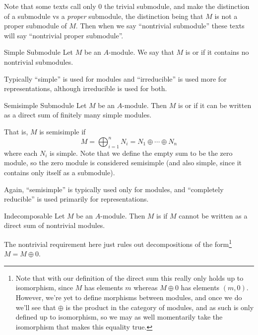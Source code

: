 \documentclass[fleqn]{NotesClass}
\begin{document}
    Note that some texts call only \(0\) the trivial submodule, and make the distinction of a submodule vs a \emph{proper} submodule, the distinction being that \(M\) is not a proper submodule of \(M\).
    Then when we say \enquote{nontrivial submodule} these texts will say \enquote{nontrivial proper submodule}.
    
    \begin{dfn}{Simple Submodule}{}
        Let \(M\) be an \(A\)-module.
        We say that \(M\) is  or  if it contains no nontrivial submodules.
    \end{dfn}
    
    Typically \enquote{simple} is used for modules and \enquote{irreducible} is used more for representations, although irreducible is used for both.
    
    \begin{dfn}{Semisimple Submodule}{}
        Let \(M\) be an \(A\)-module.
        Then \(M\) is  or  if it can be written as a direct sum of finitely many simple modules.
    \end{dfn}
    
    That is, \(M\) is semisimple if 
    \begin{equation}
        M = \bigoplus_{i=1}^n N_i = N_1 \oplus \dotsb \oplus N_n
    \end{equation}
    where each \(N_i\) is simple.
    Note that we define the empty sum to be the zero module, so the zero module is considered semisimple (and also simple, since it contains only itself as a submodule).
    
    Again, \enquote{semisimple} is typically used only for modules, and \enquote{completely reducible} is used primarily for representations.
    
    \begin{dfn}{Indecomposable}{}
        Let \(M\) be an \(A\)-module.
        Then \(M\) is  if \(M\) cannot be written as a direct sum of nontrivial modules.
    \end{dfn}
    
    The nontrivial requirement here just rules out decompositions of the form\footnote{Note that with our definition of the direct sum this really only holds up to isomorphism, since \(M\) has elements \(m\) whereas \(M \oplus 0\) has elements \((m, 0)\). However, we're yet to define morphisms between modules, and once we do we'll see that \(\oplus\) is the product in the category of modules, and as such is only defined up to isomorphism, so we may as well momentarily take the isomorphism that makes this equality true.} \(M = M \oplus 0\).
    
\end{document}
